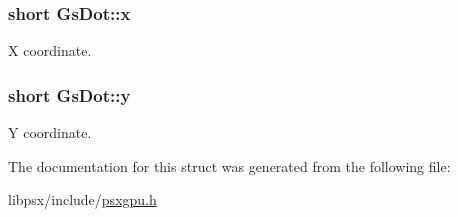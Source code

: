 \hypertarget{structGsDot_a3cbac231ecaa41fb57f867895fca1891}{}
\subsubsection[{x}]{\setlength{\rightskip}{0pt plus 5cm}short Gs\+Dot\+::x}\label{structGsDot_a3cbac231ecaa41fb57f867895fca1891}


X coordinate. 

\hypertarget{structGsDot_af152c90f2f5a80201f7736d4ed84d61b}{}
\subsubsection[{y}]{\setlength{\rightskip}{0pt plus 5cm}short Gs\+Dot\+::y}\label{structGsDot_af152c90f2f5a80201f7736d4ed84d61b}


Y coordinate. 



The documentation for this struct was generated from the following file\+:\begin{DoxyCompactItemize}
\item 
libpsx/include/\hyperlink{psxgpu_8h}{psxgpu.\+h}\end{DoxyCompactItemize}
